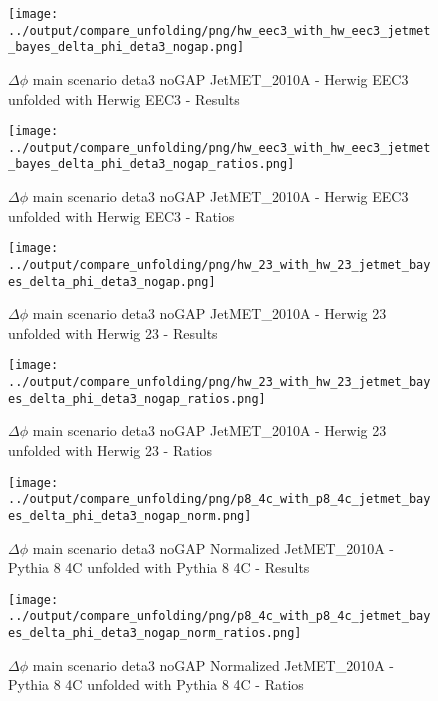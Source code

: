 \documentclass[11pt]{book}
\begin{document}
\begin{figure}[ht]
\centering
\texttt{[image: ../output/compare\_unfolding/png/hw\_eec3\_with\_hw\_eec3\_jetmet\_bayes\_delta\_phi\_deta3\_nogap.png]}
\caption{$\Delta\phi$ main scenario deta3 noGAP JetMET\_2010A - Herwig EEC3 unfolded with Herwig EEC3 - Results}
\label{hw_eec3_hw_eec3_jetmet_bayes_delta_phi_deta3_nogap_a}
\end{figure}

\begin{figure}[ht]
\centering
\texttt{[image: ../output/compare\_unfolding/png/hw\_eec3\_with\_hw\_eec3\_jetmet\_bayes\_delta\_phi\_deta3\_nogap\_ratios.png]}
\caption{$\Delta\phi$ main scenario deta3 noGAP JetMET\_2010A - Herwig EEC3 unfolded with Herwig EEC3 - Ratios}
\label{hw_eec3_hw_eec3_jetmet_bayes_delta_phi_deta3_nogap_b}
\end{figure}

\begin{figure}[ht]
\centering
\texttt{[image: ../output/compare\_unfolding/png/hw\_23\_with\_hw\_23\_jetmet\_bayes\_delta\_phi\_deta3\_nogap.png]}
\caption{$\Delta\phi$ main scenario deta3 noGAP JetMET\_2010A - Herwig 23 unfolded with Herwig 23 - Results}
\label{hw_23_hw_23_jetmet_bayes_delta_phi_deta3_nogap_a}
\end{figure}

\begin{figure}[ht]
\centering
\texttt{[image: ../output/compare\_unfolding/png/hw\_23\_with\_hw\_23\_jetmet\_bayes\_delta\_phi\_deta3\_nogap\_ratios.png]}
\caption{$\Delta\phi$ main scenario deta3 noGAP JetMET\_2010A - Herwig 23 unfolded with Herwig 23 - Ratios}
\label{hw_23_hw_23_jetmet_bayes_delta_phi_deta3_nogap_b}
\end{figure}


\begin{figure}[ht]
\centering
\texttt{[image: ../output/compare\_unfolding/png/p8\_4c\_with\_p8\_4c\_jetmet\_bayes\_delta\_phi\_deta3\_nogap\_norm.png]}
\caption{$\Delta\phi$ main scenario deta3 noGAP Normalized JetMET\_2010A - Pythia 8 4C unfolded with Pythia 8 4C - Results}
\label{p8_p8_jetmet_bayes_delta_phi_deta3_nogap_norm_a}
\end{figure}

\begin{figure}[ht]
\centering
\texttt{[image: ../output/compare\_unfolding/png/p8\_4c\_with\_p8\_4c\_jetmet\_bayes\_delta\_phi\_deta3\_nogap\_norm\_ratios.png]}
\caption{$\Delta\phi$ main scenario deta3 noGAP Normalized JetMET\_2010A - Pythia 8 4C unfolded with Pythia 8 4C - Ratios}
\label{p8_p8_jetmet_bayes_delta_phi_deta3_nogap_norm_b}
\end{figure}
\end{document}
